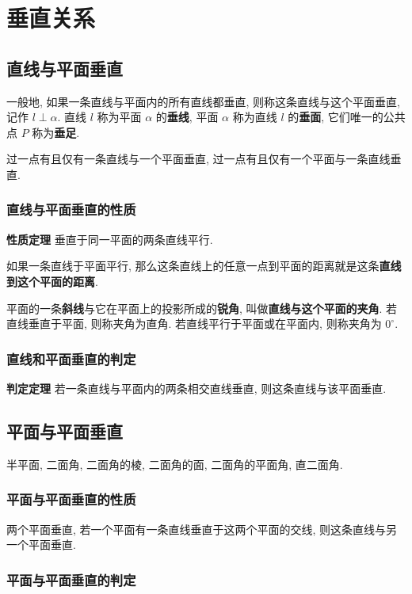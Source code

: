 \documentclass[titlepage]{ctexart}
\begin{document}
\section{垂直关系}

\subsection{直线与平面垂直}

一般地, 如果一条直线与平面内的所有直线都垂直, 则称这条直线与这个平面垂直, 记作 $l \perp \alpha$.
直线 $l$ 称为平面 $\alpha$ 的\textbf{垂线}, 平面 $\alpha$ 称为直线 $l$ 的\textbf{垂面}, 它们唯一的公共点 $P$ 称为\textbf{垂足}.

过一点有且仅有一条直线与一个平面垂直, 过一点有且仅有一个平面与一条直线垂直.

\subsubsection{直线与平面垂直的性质}

\textbf{性质定理} \quad 垂直于同一平面的两条直线平行.

如果一条直线于平面平行, 那么这条直线上的任意一点到平面的距离就是这条\textbf{直线到这个平面的距离}.

平面的一条\textbf{斜线}与它在平面上的投影所成的\textbf{锐角}, 叫做\textbf{直线与这个平面的夹角}.
若直线垂直于平面, 则称夹角为直角. 若直线平行于平面或在平面内, 则称夹角为 $0^\circ$.

\subsubsection{直线和平面垂直的判定}

\textbf{判定定理} \quad 若一条直线与平面内的两条相交直线垂直, 则这条直线与该平面垂直.

\subsection{平面与平面垂直}

半平面, 二面角, 二面角的棱, 二面角的面, 二面角的平面角, 直二面角.

\subsubsection{平面与平面垂直的性质}

两个平面垂直, 若一个平面有一条直线垂直于这两个平面的交线, 则这条直线与另一个平面垂直.

\subsubsection{平面与平面垂直的判定}
\end{document}
